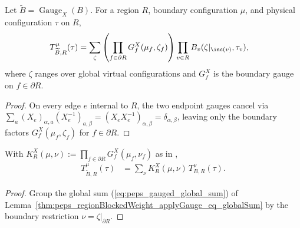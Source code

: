 \begin{lemma}
    \label{thm:peps_regionBlockedWeight_applyGauge_eq_globalSum}
    \leanok
    Let $\widetilde B=\operatorname{Gauge}_X(B)$. For a region $R$, boundary
    configuration $\mu$, and physical configuration $\tau$ on $R$,
    \begin{align}
        T_{\widetilde B,R}^{\mu}(\tau)
         & =
        \sum_{\zeta}
        \left(\prod_{f\in\partial R}G_f^X(\mu_f,\zeta_f)\right)
        \prod_{v\in R}B_v(\zeta|_{\inc(v)},\tau_v),
        \label{eq:peps_gauged_global_sum}
    \end{align}
    where $\zeta$ ranges over global virtual configurations and $G_f^X$ is the
    boundary gauge on $f\in\partial R$.
\end{lemma}
\begin{proof}\leanok
    On every edge $e$ internal to $R$, the two endpoint gauges cancel via
    $\sum_a (X_e)_{\alpha,a}(X_e^{-1})_{a,\beta}=(X_eX_e^{-1})_{\alpha,\beta}=\delta_{\alpha,\beta}$,
    leaving only the boundary factors $G_f^X(\mu_f,\zeta_f)$ for $f\in\partial R$.
\end{proof}

\begin{lemma}
    \label{thm:peps_regionBlockedWeight_applyGauge}
    \leanok
    With $K_R^X(\mu,\nu):=\prod_{f\in\partial R}G_f^X(\mu_f,\nu_f)$ as in
    \cite[Section~4, proof of Theorem~3]{Molnar2018NormalPEPS},
    \begin{align}
        T_{\widetilde B,R}^{\mu}(\tau)
         & =
        \sum_{\nu}K_R^X(\mu,\nu)\,T_{B,R}^{\nu}(\tau).
        \label{eq:peps_boundary_coupling}
    \end{align}
\end{lemma}
\begin{proof}\leanok
    Group the global sum (\ref{eq:peps_gauged_global_sum}) of
    Lemma~\ref{thm:peps_regionBlockedWeight_applyGauge_eq_globalSum} by the
    boundary restriction $\nu=\zeta|_{\partial R}$.
\end{proof}

